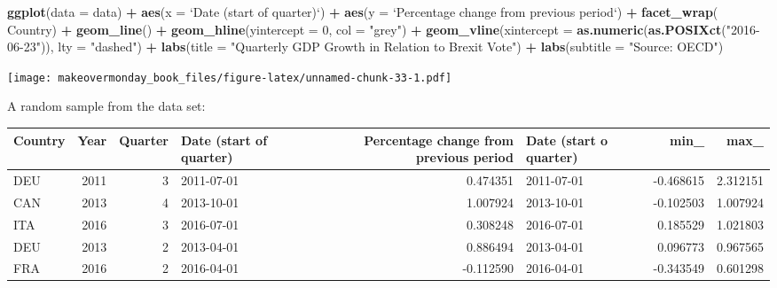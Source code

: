 \documentclass[]{book}
\newenvironment{Shaded}{\begin{snugshade}}{\end{snugshade}}
\newcommand{\KeywordTok}[1]{\textcolor[rgb]{0.13,0.29,0.53}{\textbf{#1}}}
\newcommand{\DataTypeTok}[1]{\textcolor[rgb]{0.13,0.29,0.53}{#1}}
\newcommand{\DecValTok}[1]{\textcolor[rgb]{0.00,0.00,0.81}{#1}}
\newcommand{\StringTok}[1]{\textcolor[rgb]{0.31,0.60,0.02}{#1}}
\newcommand{\OperatorTok}[1]{\textcolor[rgb]{0.81,0.36,0.00}{\textbf{#1}}}
\newcommand{\NormalTok}[1]{#1}
\theoremstyle{definition}
\theoremstyle{definition}
\theoremstyle{definition}
\theoremstyle{remark}
\begin{document}
\begin{Shaded}
\begin{Highlighting}[]
\KeywordTok{ggplot}\NormalTok{(}\DataTypeTok{data =}\NormalTok{ data) }\OperatorTok{+}
\StringTok{  }\KeywordTok{aes}\NormalTok{(}\DataTypeTok{x =} \StringTok{`}\DataTypeTok{Date (start of quarter)}\StringTok{`}\NormalTok{) }\OperatorTok{+}
\StringTok{  }\KeywordTok{aes}\NormalTok{(}\DataTypeTok{y =} \StringTok{`}\DataTypeTok{Percentage change from previous period}\StringTok{`}\NormalTok{) }\OperatorTok{+}
\StringTok{  }\KeywordTok{facet_wrap}\NormalTok{(}\OperatorTok{~}\StringTok{ }\NormalTok{Country) }\OperatorTok{+}
\StringTok{  }\KeywordTok{geom_line}\NormalTok{() }\OperatorTok{+}
\StringTok{  }\KeywordTok{geom_hline}\NormalTok{(}\DataTypeTok{yintercept =} \DecValTok{0}\NormalTok{, }\DataTypeTok{col =} \StringTok{"grey"}\NormalTok{) }\OperatorTok{+}
\StringTok{  }\KeywordTok{geom_vline}\NormalTok{(}\DataTypeTok{xintercept =} \KeywordTok{as.numeric}\NormalTok{(}\KeywordTok{as.POSIXct}\NormalTok{(}\StringTok{"2016-06-23"}\NormalTok{)), }\DataTypeTok{lty =} \StringTok{"dashed"}\NormalTok{) }\OperatorTok{+}
\StringTok{  }\KeywordTok{labs}\NormalTok{(}\DataTypeTok{title =} \StringTok{"Quarterly GDP Growth in Relation to Brexit Vote"}\NormalTok{) }\OperatorTok{+}
\StringTok{  }\KeywordTok{labs}\NormalTok{(}\DataTypeTok{subtitle =} \StringTok{"Source: OECD"}\NormalTok{)}
\end{Highlighting}
\end{Shaded}

\texttt{[image: makeovermonday\_book\_files/figure-latex/unnamed-chunk-33-1.pdf]}

A random sample from the data set:

\begin{tabular}{l|r|r|l|r|l|r|r}
\hline
Country & Year & Quarter & Date (start of quarter) & Percentage change from previous period & Date (start o quarter) & min\_ & max\_\\
\hline
DEU & 2011 & 3 & 2011-07-01 & 0.474351 & 2011-07-01 & -0.468615 & 2.312151\\
\hline
CAN & 2013 & 4 & 2013-10-01 & 1.007924 & 2013-10-01 & -0.102503 & 1.007924\\
\hline
ITA & 2016 & 3 & 2016-07-01 & 0.308248 & 2016-07-01 & 0.185529 & 1.021803\\
\hline
DEU & 2013 & 2 & 2013-04-01 & 0.886494 & 2013-04-01 & 0.096773 & 0.967565\\
\hline
FRA & 2016 & 2 & 2016-04-01 & -0.112590 & 2016-04-01 & -0.343549 & 0.601298\\
\hline
\end{tabular}
\end{document}
